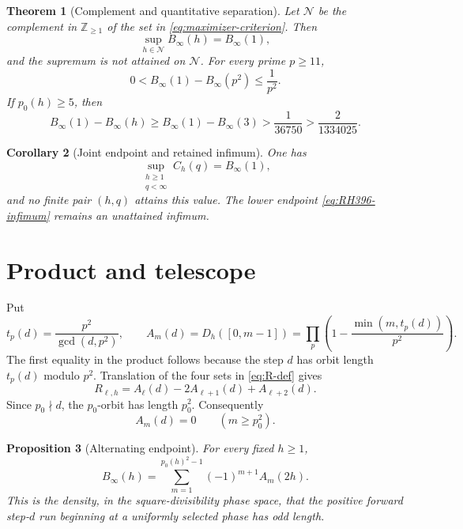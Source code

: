 \documentclass[12pt,a4paper]{article}
\newtheorem{theorem}{Theorem}[section]
\newtheorem{proposition}[theorem]{Proposition}
\newtheorem{corollary}[theorem]{Corollary}
\theoremstyle{definition}
\newcommand{\Z}{\mathbb Z}
\newcommand{\Bin}{B_\infty}
\begin{document}
\begin{theorem}[Complement and quantitative separation]
\label{thm:complement}
Let \(\mathcal N\) be the complement in \(\Z_{\geq1}\) of the set in
\eqref{eq:maximizer-criterion}.  Then
\[
 \sup_{h\in\mathcal N}\Bin(h)=\Bin(1),
\]
and the supremum is not attained on \(\mathcal N\).  For every prime
\(p\geq11\),
\begin{equation}
 0<\Bin(1)-\Bin(p^2)\leq\frac1{p^2}.
 \label{eq:prime-square-gap}
\end{equation}
If \(p_0(h)\geq5\), then
\begin{equation}
 \Bin(1)-\Bin(h)\geq\Bin(1)-\Bin(3)
 >\frac1{36750}>\frac2{1334025}.
 \label{eq:p0-gap}
\end{equation}
\end{theorem}

\begin{corollary}[Joint endpoint and retained infimum]
\label{cor:joint}
One has
\begin{equation}
 \sup_{\substack{h\geq1\\q<\infty}}C_h(q)=\Bin(1),
 \label{eq:joint-supremum}
\end{equation}
and no finite pair \((h,q)\) attains this value.  The lower endpoint
\eqref{eq:RH396-infimum} remains an unattained infimum.
\end{corollary}

\section{Product and telescope}

Put
\begin{equation}
 t_p(d)=\frac{p^2}{\gcd(d,p^2)},\qquad
 A_m(d)=D_h([0,m-1])
 =\prod_p\left(1-\frac{\min(m,t_p(d))}{p^2}\right).
 \label{eq:A-product}
\end{equation}
The first equality in the product follows because the step \(d\) has orbit
length \(t_p(d)\) modulo \(p^2\).  Translation of the four sets in
\eqref{eq:R-def} gives
\begin{equation}
 R_{\ell,h}=A_\ell(d)-2A_{\ell+1}(d)+A_{\ell+2}(d).
 \label{eq:R-second-difference}
\end{equation}
Since \(p_0\nmid d\), the \(p_0\)-orbit has length \(p_0^2\).  Consequently
\begin{equation}
 A_m(d)=0\qquad(m\geq p_0^2).
 \label{eq:A-cutoff}
\end{equation}

\begin{proposition}[Alternating endpoint]
\label{prop:telescope}
For every fixed \(h\geq1\),
\begin{equation}
 \boxed{\displaystyle
 \Bin(h)=\sum_{m=1}^{p_0(h)^2-1}(-1)^{m+1}A_m(2h).}
 \label{eq:B-alternating}
\end{equation}
This is the density, in the square-divisibility phase space, that the positive
forward step-\(d\) run beginning at a uniformly selected phase has odd length.
\end{proposition}
\end{document}
